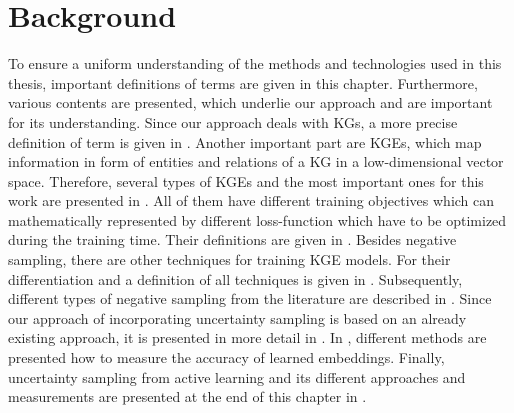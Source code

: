 \chapter{Background}
\label{ch:background}

To ensure a uniform understanding of the methods and technologies used in this thesis, important definitions of terms are given in this chapter.
Furthermore, various contents are presented, which underlie our approach and are important for its understanding.
Since our approach deals with \acp{KG}, a more precise definition of term is given in .
Another important part are \acp{KGE}, which map information in form of entities and relations of a \ac{KG} in a low-dimensional vector space.
Therefore, several types of \acp{KGE} and the most important ones for this work are presented in .
All of them have different training objectives which can mathematically represented by different loss-function which have to be optimized during the training time.
Their definitions are given in .
Besides negative sampling, there are other techniques for training \ac{KGE} models.
For their differentiation and a definition of all techniques is given in . 
Subsequently, different types of negative sampling from the literature are described in .
Since our approach of incorporating uncertainty sampling is based on an already existing approach, it is presented in more detail in .
In , different methods are presented how to measure the accuracy of learned embeddings.
Finally, uncertainty sampling from active learning and its different approaches and measurements are presented at the end of this chapter in .





























